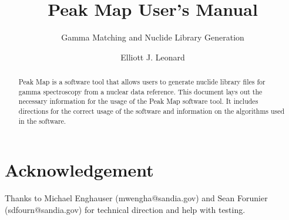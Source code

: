 \documentclass[12pt,report,justified]{SANDreport}
\title{Peak Map User’s Manual}
\subtitle{Gamma Matching and Nuclide Library Generation}
\author{Elliott J. Leonard}
\date{}
\begin{document}
    \maketitle


    \begin{abstract}
Peak Map is a software tool that allows users to generate nuclide library files for gamma spectroscopy
from a nuclear data reference. This document lays out the necessary information for the
usage of the Peak Map software tool. It includes directions for the correct usage of the software
and information on the algorithms used in the software.
    \end{abstract}


    \chapter*{Acknowledgement}
Thanks to Michael Enghauser (mwengha@sandia.gov) and Sean Forunier (sdfourn@sandia.gov)
for technical direction and help with testing.


    \tableofcontents
    \listoffigures
    \listoftables



\end{document}

